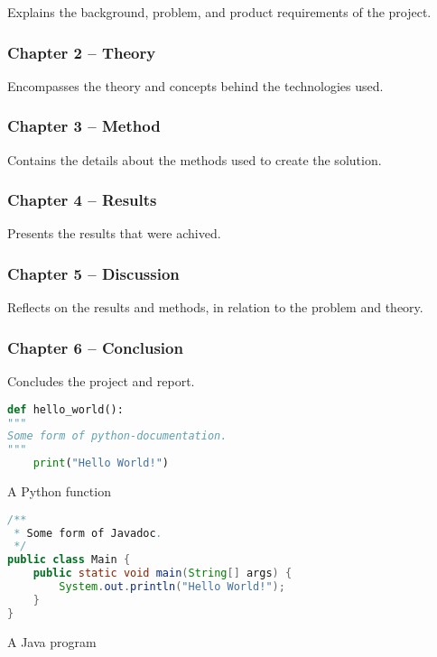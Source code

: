 Explains the background, problem, and product requirements of the project.

\subsubsection*{Chapter 2 -- Theory}

Encompasses the theory and concepts behind the technologies used.

\subsubsection*{Chapter 3 -- Method}

Contains the details about the methods used to create the solution.

\subsubsection*{Chapter 4 -- Results}

Presents the results that were achived.

\subsubsection*{Chapter 5 -- Discussion}

Reflects on the results and methods, in relation to the problem and theory.

\subsubsection*{Chapter 6 -- Conclusion}

Concludes the project and report.

\begin{code}
\begin{lstlisting}[language=python]
def hello_world():
"""
Some form of python-documentation.
"""
    print("Hello World!")
\end{lstlisting}
\caption{A Python function}
\label{code:python}
\end{code}



\begin{code}
\begin{lstlisting}[language=java]
/**
 * Some form of Javadoc.
 */
public class Main {
    public static void main(String[] args) {
        System.out.println("Hello World!");
    }
}
\end{lstlisting}
\caption{A Java program}
\label{code:java}
\end{code}





